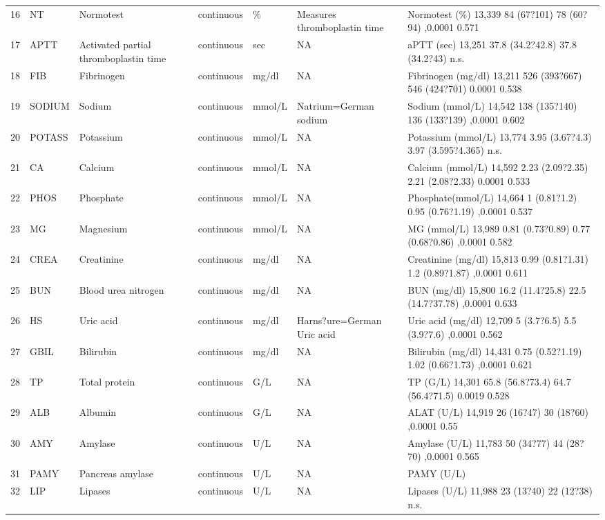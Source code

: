 \documentclass[
  letterpaper,
  DIV=11,
  numbers=noendperiod]{scrreport}
\begin{document}
\begin{longtable}{rllllll}
16 & NT & Normotest & continuous & \% & Measures thromboplastin time & Normotest (\%) 13,339 84 (67?101) 78 (60?94) ,0.0001 0.571 \\ 
17 & APTT & Activated partial thromboplastin time & continuous & sec & NA & aPTT (sec) 13,251 37.8 (34.2?42.8) 37.8 (34.2?43) n.s. \\ 
18 & FIB & Fibrinogen & continuous & mg/dl & NA & Fibrinogen (mg/dl) 13,211 526 (393?667) 546 (424?701) 0.0001 0.538 \\ 
19 & SODIUM & Sodium & continuous & mmol/L & Natrium=German sodium & Sodium (mmol/L) 14,542 138 (135?140) 136 (133?139) ,0.0001 0.602 \\ 
20 & POTASS & Potassium & continuous & mmol/L & NA & Potassium (mmol/L) 13,774 3.95 (3.67?4.3) 3.97 (3.595?4.365) n.s. \\ 
21 & CA & Calcium & continuous & mmol/L & NA & Calcium (mmol/L) 14,592 2.23 (2.09?2.35) 2.21 (2.08?2.33) 0.0001 0.533 \\ 
22 & PHOS & Phosphate & continuous & mmol/L & NA & Phosphate(mmol/L) 14,664 1 (0.81?1.2) 0.95 (0.76?1.19) ,0.0001 0.537 \\ 
23 & MG & Magnesium & continuous & mmol/L & NA & MG (mmol/L) 13,989 0.81 (0.73?0.89) 0.77 (0.68?0.86) ,0.0001 0.582 \\ 
24 & CREA & Creatinine & continuous & mg/dl & NA & Creatinine (mg/dl) 15,813 0.99 (0.81?1.31) 1.2 (0.89?1.87) ,0.0001 0.611 \\ 
25 & BUN & Blood urea nitrogen & continuous & mg/dl & NA & BUN (mg/dl) 15,800 16.2 (11.4?25.8) 22.5 (14.7?37.78) ,0.0001 0.633 \\ 
26 & HS & Uric acid & continuous & mg/dl & Harns?ure=German Uric acid & Uric acid (mg/dl) 12,709 5 (3.7?6.5) 5.5 (3.9?7.6) ,0.0001 0.562 \\ 
27 & GBIL & Bilirubin & continuous & mg/dl & NA & Bilirubin (mg/dl) 14,431 0.75 (0.52?1.19) 1.02 (0.66?1.73) ,0.0001 0.621 \\ 
28 & TP & Total protein & continuous & G/L & NA & TP (G/L) 14,301 65.8 (56.8?73.4) 64.7 (56.4?71.5) 0.0019 0.528 \\ 
29 & ALB & Albumin & continuous & G/L & NA & ALAT (U/L) 14,919 26 (16?47) 30 (18?60) ,0.0001 0.55 \\ 
30 & AMY & Amylase & continuous & U/L & NA & Amylase (U/L) 11,783 50 (34?77) 44 (28?70) ,0.0001 0.565 \\ 
31 & PAMY & Pancreas amylase & continuous & U/L & NA & PAMY (U/L) \\ 
32 & LIP & Lipases & continuous & U/L & NA & Lipases (U/L) 11,988 23 (13?40) 22 (12?38) n.s. \\ 

\end{longtable}
\end{document}
